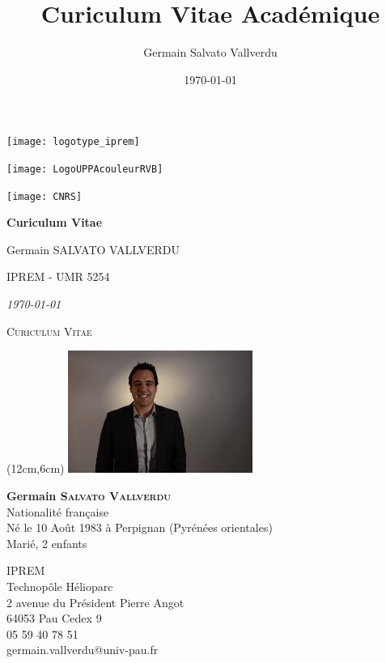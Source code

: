 \documentclass[11pt]{artuppax}
\title{Curiculum Vitae Académique}
\author{Germain Salvato Vallverdu}
\date{\today}
\renewcommand{\maketitle}{%
    \thispagestyle{titlepage}
    \singlespacing
    \begin{center}
        \parbox{.33\textwidth}{\texttt{[image: logotype\_iprem]}}
        \parbox{.33\textwidth}{\centering \texttt{[image: LogoUPPAcouleurRVB]}}
        \parbox{.33\textwidth}{\hfill\texttt{[image: CNRS]}}

        \vspace*{\stretch{1}}

        {\Huge\bfseries\setlength{\baselineskip}{1.2\baselineskip}%
        Curiculum Vitae
        \par}

        \vspace{4ex}

        {\LARGE Germain SALVATO VALLVERDU}

        {\Large IPREM - UMR 5254}

        {\Large\itshape\today}

    \end{center}
    \vspace*{\stretch{1}}
    }
\begin{document}
%
%

\maketitle


\newpage




\begin{center}
    \LARGE
    \textsc{Curiculum Vitae}
\end{center}
\vspace*{10mm}

	\begin{textblock*}{60mm}(12cm,6cm)
	    \includegraphics[height=4cm]{gvallver}
	\end{textblock*}


\textbf{\large Germain \textsc{Salvato Vallverdu}} \\
Nationalité française \\
Né le 10 Août 1983 à Perpignan (Pyrénées orientales) \\
Marié, 2 enfants


\faFlask{} IPREM\\
Technopôle Hélioparc\\
2 avenue du Président Pierre Angot\\
64053 Pau Cedex 9\\
\faPhone{} 05 59 40 78 51\\
\faAt{} germain.vallverdu@univ-pau.fr \par
\end{document}
